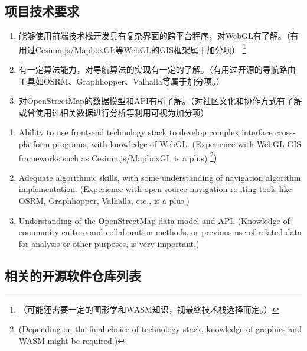 \documentclass{beamer}
\begin{document}
\subsection{项目技术要求}

\begin{frame}
    \begin{enumerate}
        \item 能够使用前端技术栈开发具有复杂界面的跨平台程序，对WebGL有了解。（有用过Cesium.js/MapboxGL等WebGL的GIS框架属于加分项）
        \footnote{（可能还需要一定的图形学和WASM知识，视最终技术栈选择而定。）}
        \item 有一定算法能力，对导航算法的实现有一定的了解。（有用过开源的导航路由工具如OSRM、Graphhopper、Valhalla等属于加分项。）
        \item 对OpenStreetMap的数据模型和API有所了解。（对社区文化和协作方式有了解或曾使用过相关数据进行分析等利用可视为加分项）
    \end{enumerate}
\end{frame}

\begin{frame}
    \begin{enumerate}
        \item Ability to use front-end technology stack to develop complex interface cross-platform programs, with knowledge of WebGL. (Experience with WebGL GIS frameworks such as Cesium.js/MapboxGL is a plus)
        \footnote{(Depending on the final choice of technology stack, knowledge of graphics and WASM might be required.)}）
        \item Adequate algorithmic skills, with some understanding of navigation algorithm implementation. (Experience with open-source navigation routing tools like OSRM, Graphhopper, Valhalla, etc., is a plus.)
        \item Understanding of the OpenStreetMap data model and API. (Knowledge of community culture and collaboration methods, or previous use of related data for analysis or other purposes, is very important.)
    \end{enumerate}
\end{frame}


\subsection{相关的开源软件仓库列表}
\end{document}
